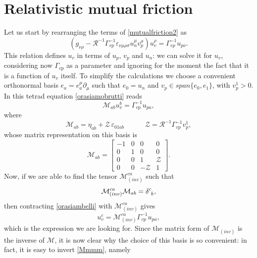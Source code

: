 \documentclass[usenatbib%
]{mnras}
\newcommand{\spc}{\quad \quad \quad}
\begin{document}
\section{Relativistic mutual friction}\label{sec:Reduction of the mutual friction}

Let us start by rearranging the terms of \eqref{mutualfriction2} as
\begin{equation}\label{orasiamobrutti}
( g_{\nu \rho} - \mathcal{R}^{-1}\Gamma_{vp}^{-1}\varepsilon_{\nu \mu \rho \sigma} u_n^\mu  v_p^\sigma)u_v^\rho = \Gamma_{vp}^{-1} u_{p\nu}. 
\end{equation}
This relation defines $u_v$ in terms of $u_p$, $v_p$ and $u_n$: we can solve it for $u_v$, considering now $\Gamma_{vp}$ as a parameter and ignoring for the moment the fact that it is a function of $u_v$ itself. 
To simplify the calculations we choose a convenient orthonormal basis $e_a = e_a^\mu \partial_\mu$ such that $e_0 = u_n$ and $v_p \in span \{ e_0 , e_1 \}$, with $v_p^1>0$. 
In this tetrad equation \eqref{orasiamobrutti} reads
\begin{equation}\label{orasiambelli}
\mathcal{M}_{ab} u_{v}^b = \Gamma_{vp}^{-1} u_{pa},
\end{equation}
where
\begin{equation}
\mathcal{M}_{ab}= \eta_{ab} + \mathcal{Z} \, \varepsilon_{01ab} \spc  \mathcal{Z}= \mathcal{R}^{-1} \Gamma_{vp}^{-1} v_p^1,
\end{equation}
whose matrix representation on this basis is
\begin{equation}\label{Mmmm}
\mathcal{M}_{ab} =
\begin{bmatrix}
  -1  & 0 &  0 &  0  \\
   0 & 1 & 0 & 0  \\
   0 & 0 & 1 & \mathcal{Z}  \\
   0 & 0 & -\mathcal{Z} & 1
\end{bmatrix}.
\end{equation} 
Now,  if we are able to find the tensor $\mathcal{M}^{ca}_{(inv)}$ such that
\begin{equation}
\mathcal{M}^{ca}_{(inv)} \mathcal{M}_{ab} = \delta\indices{^c_b},
\end{equation}
then contracting \eqref{orasiambelli} with $\mathcal{M}^{ca}_{(inv)}$ gives
\begin{equation}\label{cisiarrivaeasy}
u_v^c = \mathcal{M}_{(inv)}^{ca} \Gamma_{vp}^{-1}u_{pa},
\end{equation}
which is the expression we are looking for. 
Since the matrix form of $\mathcal{M}_{(inv)}$ is the inverse of $\mathcal{M}$, it is now clear why the choice of this basis is so convenient: in fact, it is easy to invert \eqref{Mmmm}, namely 
\end{document}
